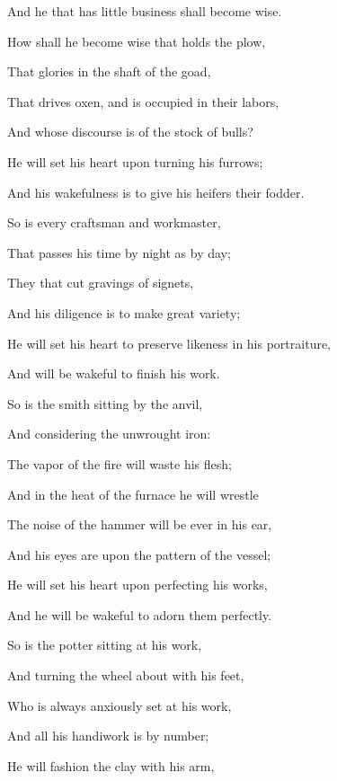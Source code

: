 {\par }{\Q And
 he that has little business shall become wise.
\par }{\Q {}How shall he become wise that holds the plow,
\par }{\Q That glories in the shaft of the goad,
\par }{\Q That drives oxen, and is occupied in their labors,
\par }{\Q And whose discourse is of the stock of bulls?
\par }{\Q {}He will set his heart upon turning his furrows;
\par }{\Q And his wakefulness is to give his heifers their fodder.
\par }{\Q {}So is every craftsman and workmaster,
\par }{\Q That passes his time by night as by day;
\par }{\Q They that cut gravings of signets,
\par }{\Q And his diligence is to make great variety;
\par }{\Q He will set his heart to preserve likeness in his portraiture,
\par }{\Q And will be wakeful to finish his work.
\par }{\Q {}So is the smith sitting by the anvil,
\par }{\Q And considering the unwrought iron:
\par }{\Q The vapor of the fire will waste his flesh;
\par }{\Q And in the heat of the furnace he will wrestle
{}
\par }{\Q The noise of the hammer will
 be ever in his ear,
\par }{\Q And his eyes are upon the pattern of the vessel;
\par }{\Q He will set his heart upon perfecting his works,
\par }{\Q And he will be wakeful to adorn them perfectly.
\par }{\Q {}So is the potter sitting at his work,
\par }{\Q And turning the wheel about with his feet,
\par }{\Q Who is always anxiously set at his work,
\par }{\Q And all his handiwork is by number;
\par }{\Q {}He will fashion the clay with his arm,
}
